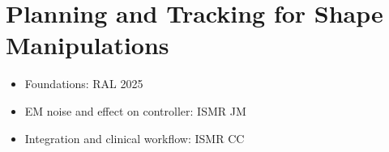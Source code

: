 \chapter{Planning and Tracking for Shape Manipulations} \label{chap:chap-5}

\begin{itemize}
\item Foundations: RAL 2025
\item EM noise and effect on controller: ISMR JM
\item Integration and clinical workflow: ISMR CC
\end{itemize}

